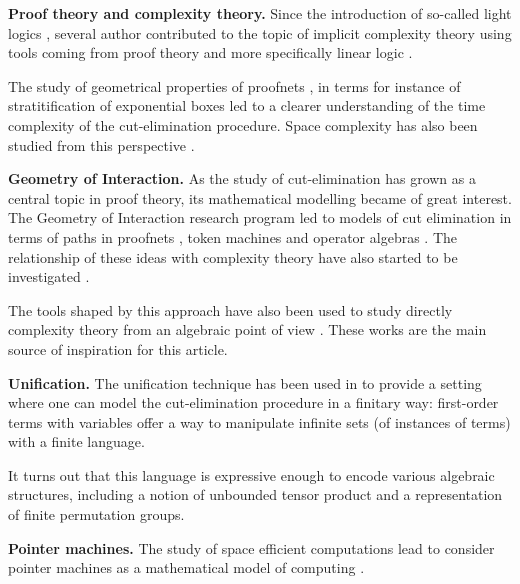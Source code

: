 \textbf{Proof theory and complexity theory.} Since the introduction of so-called light logics \cite{girard_light_1994}, several author contributed to the topic of implicit complexity theory using tools coming from proof theory and more specifically linear logic \cite{girard_linear_1987}.

The study of geometrical properties of proofnets \cite{girard_proof-nets:_1996}, in terms for instance of stratitification of exponential boxes \cite{baillot_linear_2010} led to a clearer understanding of the time complexity of the cut-elimination procedure. Space complexity has also been studied from this perspective \cite{schopp_stratified_2007,gaboardi_logical_2008}.

\smallskip\noindent
\textbf{Geometry of Interaction.} As the study of cut-elimination has grown as a central topic in proof theory, its mathematical modelling became of great interest. The Geometry of Interaction \cite{girard_geometry_1988} research program led to models of cut elimination in terms of paths in proofnets \cite{asperti_paths_1994}, token machines \cite{laurent_token_2001} and operator algebras \cite{girard_geometry_1988,girard_geometry_1989,girard_geometry_2005}. The relationship of these ideas with complexity theory have also started to be investigated \cite{schopp_space-efficient_2006,baillot_elementary_2001}.

The tools shaped by this approach have also been used to study directly complexity theory from an algebraic point of view \cite{girard_normativity_2012,aubert_characterizing_2012,seiller_logarithmic_2013}. These works are the main source of inspiration for this article.

\smallskip\noindent
\textbf{Unification.} The unification technique has been used in \cite{girard_geometry_1995,baillot_elementary_2001} to provide a setting where one can model the cut-elimination procedure in a finitary way: first-order terms with variables offer a way to manipulate infinite sets (of instances of terms) with a finite language.

It turns out that this language is expressive enough to encode various algebraic structures, including a notion of unbounded tensor product and a representation of finite permutation groups.

\smallskip\noindent
\textbf{Pointer machines.} The study of space efficient computations lead to consider pointer machines as a mathematical model of computing \cite{hofmann_pointer_2009,hofmann_pure_2010}.

